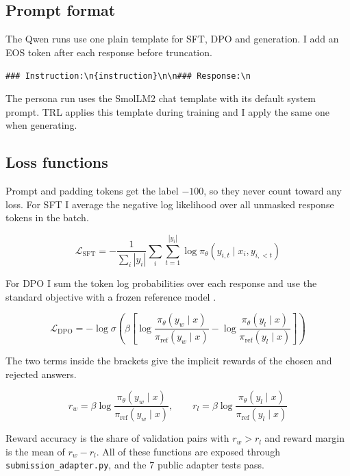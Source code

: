 \documentclass[11pt]{article}
\begin{document}
\subsection{Prompt format}

The Qwen runs use one plain template for SFT, DPO and generation.
I add an EOS token after each response before truncation.

\begin{center}
\small\texttt{\#\#\# Instruction:\textbackslash n\{instruction\}\textbackslash n\textbackslash n\#\#\# Response:\textbackslash n}
\end{center}

The persona run uses the SmolLM2 chat template with its default system prompt.
TRL applies this template during training and I apply the same one when generating.

\subsection{Loss functions}

Prompt and padding tokens get the label $-100$, so they never count toward any loss.
For SFT I average the negative log likelihood over all unmasked response tokens in the batch.

\begin{equation}
\mathcal{L}_{\text{SFT}} = -\frac{1}{\sum_i |y_i|}\sum_i \sum_{t=1}^{|y_i|} \log \pi_\theta(y_{i,t}\mid x_i, y_{i,<t})
\end{equation}

For DPO I sum the token log probabilities over each response and use the standard objective with a frozen reference model \cite{dpo}.

\begin{equation}
\mathcal{L}_{\text{DPO}} = -\log\sigma\left(\beta\left[\log\frac{\pi_\theta(y_w\mid x)}{\pi_{\text{ref}}(y_w\mid x)} - \log\frac{\pi_\theta(y_l\mid x)}{\pi_{\text{ref}}(y_l\mid x)}\right]\right)
\end{equation}

The two terms inside the brackets give the implicit rewards of the chosen and rejected answers.

\begin{equation}
r_w=\beta\log\frac{\pi_\theta(y_w\mid x)}{\pi_{\text{ref}}(y_w\mid x)}, \qquad r_l=\beta\log\frac{\pi_\theta(y_l\mid x)}{\pi_{\text{ref}}(y_l\mid x)}
\end{equation}

Reward accuracy is the share of validation pairs with $r_w>r_l$ and reward margin is the mean of $r_w-r_l$.
All of these functions are exposed through \texttt{submission\_adapter.py}, and the 7 public adapter tests pass.
\end{document}
